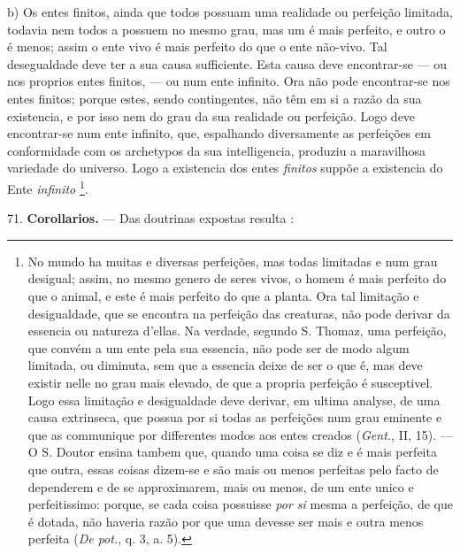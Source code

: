  b) Os entes finitos, ainda que todos possuam uma realidade ou perfeição limitada, todavia nem todos a possuem no mesmo grau, mas um é mais perfeito, e outro o é menos; assim o ente vivo é mais perfeito do que o ente não-vivo. Tal desegualdade deve ter a sua causa sufficiente. Esta causa deve encontrar-se --- ou nos proprios entes finitos, --- ou num ente infinito. Ora não pode encontrar-se nos entes finitos; porque estes, sendo contingentes, não têm em si a razão da sua existencia, e por isso nem do grau da sua realidade ou perfeição. Logo deve encontrar-se num ente infinito, que, espalhando diversamente as perfeições em conformidade com os archetypos da sua intelligencia, produziu a maravilhosa variedade do universo. Logo a existencia dos entes \emph{finitos} suppõe a existencia do Ente \emph{infinito} \footnote{No mundo ha muitas e diversas perfeições, mas todas limitadas e num grau desigual; assim, no mesmo genero de seres vivos, o homem é mais perfeito do que o animal, e este é mais perfeito do que a planta. Ora tal limitação e desigualdade, que se encontra na perfeição das creaturas, não pode derivar da essencia ou natureza d'ellas. Na verdade, segundo S. Thomaz, uma perfeição, que convém a um ente pela sua essencia, não pode ser de modo algum limitada, ou diminuta, sem que a essencia deixe de ser o que é, mas deve existir nelle no grau mais elevado, de que a propria perfeição é susceptivel. Logo essa limitação e desigualdade deve derivar, em ultima analyse, de uma causa extrinseca, que possua por si todas as perfeições num grau eminente e que as communique por differentes modos aos entes creados (\emph{Gent.}, II, 15). --- O S. Doutor ensina tambem que, quando uma coisa se diz e é mais perfeita que outra, essas coisas dizem-se e são mais ou menos perfeitas pelo facto de dependerem e de se approximarem, mais ou menos, de um ente unico e perfeitissimo: porque, se cada coisa possuisse \emph{por si} mesma a perfeição, de que é dotada, não haveria razão por que uma devesse ser mais e outra menos perfeita (\emph{De pot.}, q. 3, a. 5).}.

71. \textbf{Corollarios.} --- Das doutrinas expostas resulta :

